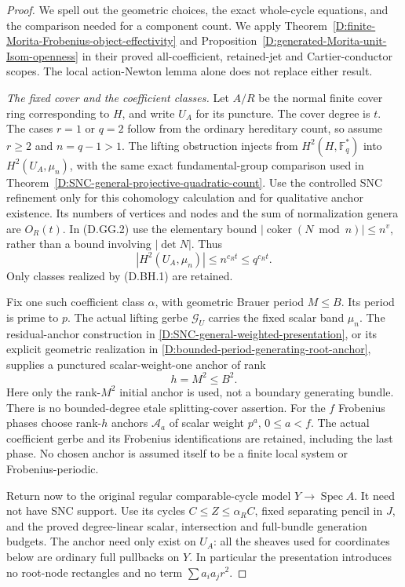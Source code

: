 \begin{proof}
We spell out the geometric choices, the exact whole-cycle
equations, and the comparison needed for a component count.
We apply Theorem~\ref{D:finite-Morita-Frobenius-object-effectivity}
and Proposition~\ref{D:generated-Morita-unit-Isom-openness}
in their proved all-coefficient, retained-jet and Cartier-conductor
scopes. The local action-Newton lemma alone does not
replace either result.

\emph{The fixed cover and the coefficient classes.}
Let $A/R$ be the normal finite cover ring corresponding to
$H$, and write $U_A$ for its puncture. The cover degree is $t$.
The cases $r=1$ or $q=2$ follow from the ordinary hereditary
count, so assume $r\ge2$ and $n=q-1>1$.
The lifting obstruction injects from
$H^2(H,\mathbb F_q^*)$ into $H^2(U_A,\mu_n)$, with the
same exact fundamental-group comparison used in
Theorem~\ref{D:SNC-general-projective-quadratic-count}.
Use the controlled SNC refinement only for this cohomology
calculation and for qualitative anchor existence. Its numbers
of vertices and nodes and the sum of normalization genera
are $O_R(t)$. In (D.GG.2) use the elementary bound
$|\operatorname{coker}(N\bmod n)|\le n^v$, rather than a
bound involving $|\det N|$. Thus
\[
                |H^2(U_A,\mu_n)|\le n^{c_Rt}\le q^{c_Rt}.
                                                        \tag{D.BH.2}
\]
Only classes realized by (D.BH.1) are retained.

Fix one such coefficient class $\alpha$, with geometric
Brauer period $M\le B$. Its period is prime to $p$.
The actual lifting gerbe $\mathcal G_U$ carries the fixed
scalar band $\mu_n$. The residual-anchor construction in
\ref{D:SNC-general-weighted-presentation}, or its explicit
geometric realization in
\ref{D:bounded-period-generating-root-anchor}, supplies a
punctured scalar-weight-one anchor of rank
\[
                            h=M^2\le B^2.               \tag{D.BH.3}
\]
Here only the rank-$M^2$ initial anchor is used, not a
boundary generating bundle. There is no bounded-degree
etale splitting-cover assertion. For the $f$ Frobenius
phases choose rank-$h$ anchors $\mathcal A_a$ of scalar
weight $p^a$, $0\le a<f$. The actual coefficient gerbe
and its Frobenius identifications are retained, including
the last phase. No chosen anchor is assumed itself to be
a finite local system or Frobenius-periodic.

Return now to the original regular comparable-cycle model
$Y\to\operatorname{Spec}A$. It need not have SNC support.
Use its cycles $C\le Z\le\alpha_R C$, fixed separating
pencil in $J$, and the proved degree-linear scalar,
intersection and full-bundle generation budgets.
The anchor need only exist on $U_A$: all the sheaves used
for coordinates below are ordinary full pullbacks on $Y$.
In particular the presentation introduces no root-node
rectangles and no term $\sum a_i a_jr^2$.


\end{proof}
